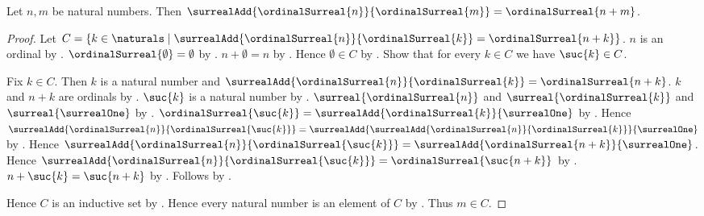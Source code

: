 \begin{theorem}\label{natural_surreal_addition_compatibility}
    Let $n,m$ be natural numbers.
    Then $\surrealAdd{\ordinalSurreal{n}}{\ordinalSurreal{m}}
        =\ordinalSurreal{n+m}$.
\end{theorem}
\begin{proof}
    Let $C=\{k\in\naturals\mid
        \surrealAdd{\ordinalSurreal{n}}{\ordinalSurreal{k}}
            =\ordinalSurreal{n+k}\}$.
    $n$ is an ordinal by .
    $\ordinalSurreal{\emptyset}=\emptyset$
        by .
    $n+\emptyset=n$ by .
    Hence $\emptyset\in C$
        by .
    Show that for every $k\in C$ we have $\suc{k}\in C$.
    \begin{subproof}
        Fix $k\in C$.
        Then $k$ is a natural number and
            $\surrealAdd{\ordinalSurreal{n}}{\ordinalSurreal{k}}
                =\ordinalSurreal{n+k}$.
        $k$ and $n+k$ are ordinals
            by .
        $\suc{k}$ is a natural number by .
        $\surreal{\ordinalSurreal{n}}$ and
            $\surreal{\ordinalSurreal{k}}$ and
            $\surreal{\surrealOne}$
            by .
        $\ordinalSurreal{\suc{k}}
            =\surrealAdd{\ordinalSurreal{k}}{\surrealOne}$
            by .
        Hence
        $\surrealAdd{\ordinalSurreal{n}}{\ordinalSurreal{\suc{k}}}
            =\surrealAdd
                {\surrealAdd{\ordinalSurreal{n}}{\ordinalSurreal{k}}}
                {\surrealOne}$
            by .
        Hence
        $\surrealAdd{\ordinalSurreal{n}}{\ordinalSurreal{\suc{k}}}
            =\surrealAdd{\ordinalSurreal{n+k}}{\surrealOne}$.
        Hence
        $\surrealAdd{\ordinalSurreal{n}}{\ordinalSurreal{\suc{k}}}
            =\ordinalSurreal{\suc{n+k}}$
            by .
        $n+\suc{k}=\suc{n+k}$
            by .
        Follows by
            .
    \end{subproof}
    Hence $C$ is an inductive set by .
    Hence every natural number is an element of $C$
        by .
    Thus $m\in C$.
\end{proof}

